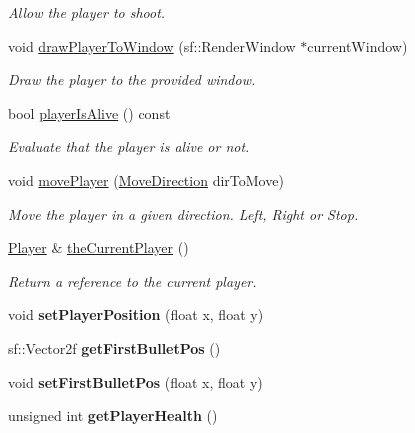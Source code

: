 \begin{DoxyCompactItemize}
\begin{DoxyCompactList}\small\item\em Allow the player to shoot. \end{DoxyCompactList}\item 
void \hyperlink{class_player_manager_a8dfbc91721f7c9cfeae80ae7fa89602e}{draw\+Player\+To\+Window} (sf\+::\+Render\+Window $\ast$current\+Window)
\begin{DoxyCompactList}\small\item\em Draw the player to the provided window. \end{DoxyCompactList}\item 
\mbox{\label{class_player_manager_ab927a10c2c602c42daf2e11eb8861692}} 
bool \hyperlink{class_player_manager_ab927a10c2c602c42daf2e11eb8861692}{player\+Is\+Alive} () const
\begin{DoxyCompactList}\small\item\em Evaluate that the player is alive or not. \end{DoxyCompactList}\item 
void \hyperlink{class_player_manager_a95358a4f97cf343f5d5d01a440c5dc76}{move\+Player} (\hyperlink{_player_manager_8h_a00ec4eba48da32d6cbdf827185fd3d34}{Move\+Direction} dir\+To\+Move)
\begin{DoxyCompactList}\small\item\em Move the player in a given direction. Left, Right or Stop. \end{DoxyCompactList}\item 
\mbox{\label{class_player_manager_aa70cd9ab8f7a582c27bef02e12a408e7}} 
\hyperlink{class_player}{Player} \& \hyperlink{class_player_manager_aa70cd9ab8f7a582c27bef02e12a408e7}{the\+Current\+Player} ()
\begin{DoxyCompactList}\small\item\em Return a reference to the current player. \end{DoxyCompactList}\item 
\mbox{\label{class_player_manager_afbce199fe8a661b8002ae94b8396c7aa}} 
void {\bfseries set\+Player\+Position} (float x, float y)
\item 
\mbox{\label{class_player_manager_a1e058a4c38ae4b17a8541feb40247d06}} 
sf\+::\+Vector2f {\bfseries get\+First\+Bullet\+Pos} ()
\item 
\mbox{\label{class_player_manager_ae654ee04f5d9820cbb4c6b91161cc7a2}} 
void {\bfseries set\+First\+Bullet\+Pos} (float x, float y)
\item 
\mbox{\label{class_player_manager_a1e1d29acf1a54f18fafe6a2a91c67ee7}} 
unsigned int {\bfseries get\+Player\+Health} ()
\end{DoxyCompactItemize}


